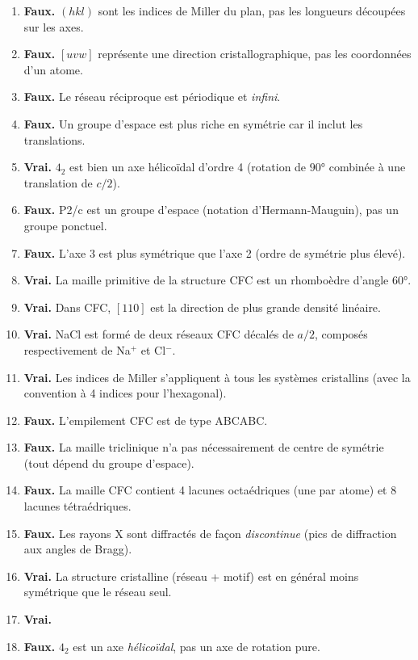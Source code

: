 \documentclass[12pt,a4paper]{article}
\begin{document}
\begin{boitecorrige}

\begin{enumerate}
\item \textbf{Faux.} $(hkl)$ sont les indices de Miller du plan, pas les longueurs découpées sur les axes.
\item \textbf{Faux.} $[uvw]$ représente une direction cristallographique, pas les coordonnées d'un atome.
\item \textbf{Faux.} Le réseau réciproque est périodique et \emph{infini}.
\item \textbf{Faux.} Un groupe d'espace est plus riche en symétrie car il inclut les translations.
\item \textbf{Vrai.} $4_2$ est bien un axe hélicoïdal d'ordre 4 (rotation de $90°$ combinée à une translation de $c/2$).
\item \textbf{Faux.} P2/c est un groupe d'espace (notation d'Hermann-Mauguin), pas un groupe ponctuel.
\item \textbf{Faux.} L'axe 3 est plus symétrique que l'axe 2 (ordre de symétrie plus élevé).
\item \textbf{Vrai.} La maille primitive de la structure CFC est un rhomboèdre d'angle $60°$.
\item \textbf{Vrai.} Dans CFC, $[110]$ est la direction de plus grande densité linéaire.
\item \textbf{Vrai.} NaCl est formé de deux réseaux CFC décalés de $a/2$, composés respectivement de Na$^+$ et Cl$^-$.
\item \textbf{Vrai.} Les indices de Miller s'appliquent à tous les systèmes cristallins (avec la convention à 4 indices pour l'hexagonal).
\item \textbf{Faux.} L'empilement CFC est de type ABCABC.
\item \textbf{Faux.} La maille triclinique n'a pas nécessairement de centre de symétrie (tout dépend du groupe d'espace).
\item \textbf{Faux.} La maille CFC contient 4 lacunes octaédriques (une par atome) et 8 lacunes tétraédriques.
\item \textbf{Faux.} Les rayons X sont diffractés de façon \emph{discontinue} (pics de diffraction aux angles de Bragg).
\item \textbf{Vrai.} La structure cristalline (réseau + motif) est en général moins symétrique que le réseau seul.
\item \textbf{Vrai.}
\item \textbf{Faux.} $4_2$ est un axe \emph{hélicoïdal}, pas un axe de rotation pure.

\end{enumerate}
\end{boitecorrige}
\end{document}
